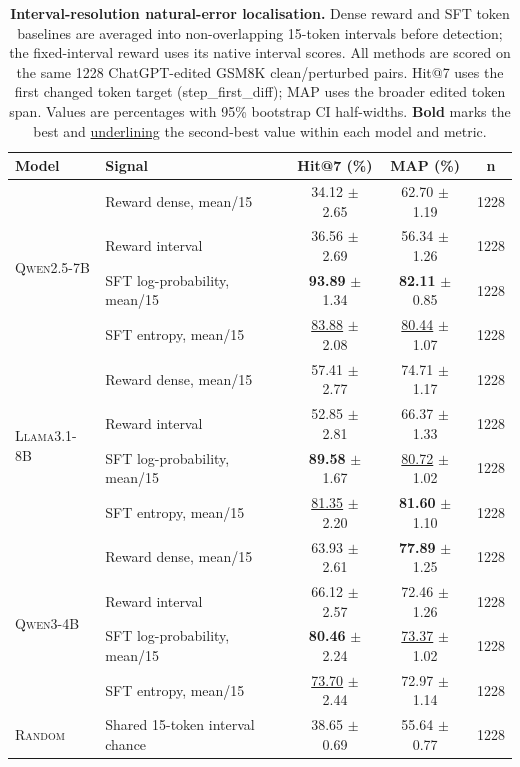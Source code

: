 \begin{table}[t]
\centering
\small
\setlength{\tabcolsep}{5pt}
\caption{\textbf{Interval-resolution natural-error localisation.} Dense reward and SFT token baselines are averaged into non-overlapping 15-token intervals before detection; the fixed-interval reward uses its native interval scores. All methods are scored on the same 1228 ChatGPT-edited GSM8K clean/perturbed pairs. Hit@7 uses the first changed token target (step\_first\_diff); MAP uses the broader edited token span. Values are percentages with 95\% bootstrap CI half-widths. \textbf{Bold} marks the best and \underline{underlining} the second-best value within each model and metric.}
\label{tab:localisation_chatgpt_step_sft_interval15_hit7_map}
\begin{tabular}{llccc}
\toprule
\textbf{Model} & \textbf{Signal} & \textbf{Hit@7 (\%)} & \textbf{MAP (\%)} & \textbf{n} \\
\midrule
\multirow{4}{*}{\textsc{Qwen2.5-7B}} & Reward dense, mean/15 & 34.12 $\pm$ 2.65 & 62.70 $\pm$ 1.19 & 1228 \\
 & Reward interval & 36.56 $\pm$ 2.69 & 56.34 $\pm$ 1.26 & 1228 \\
 & SFT log-probability, mean/15 & \textbf{93.89} $\pm$ 1.34 & \textbf{82.11} $\pm$ 0.85 & 1228 \\
 & SFT entropy, mean/15 & \underline{83.88} $\pm$ 2.08 & \underline{80.44} $\pm$ 1.07 & 1228 \\
\midrule
\multirow{4}{*}{\textsc{Llama3.1-8B}} & Reward dense, mean/15 & 57.41 $\pm$ 2.77 & 74.71 $\pm$ 1.17 & 1228 \\
 & Reward interval & 52.85 $\pm$ 2.81 & 66.37 $\pm$ 1.33 & 1228 \\
 & SFT log-probability, mean/15 & \textbf{89.58} $\pm$ 1.67 & \underline{80.72} $\pm$ 1.02 & 1228 \\
 & SFT entropy, mean/15 & \underline{81.35} $\pm$ 2.20 & \textbf{81.60} $\pm$ 1.10 & 1228 \\
\midrule
\multirow{4}{*}{\textsc{Qwen3-4B}} & Reward dense, mean/15 & 63.93 $\pm$ 2.61 & \textbf{77.89} $\pm$ 1.25 & 1228 \\
 & Reward interval & 66.12 $\pm$ 2.57 & 72.46 $\pm$ 1.26 & 1228 \\
 & SFT log-probability, mean/15 & \textbf{80.46} $\pm$ 2.24 & \underline{73.37} $\pm$ 1.02 & 1228 \\
 & SFT entropy, mean/15 & \underline{73.70} $\pm$ 2.44 & 72.97 $\pm$ 1.14 & 1228 \\
\midrule
\textsc{Random} & Shared 15-token interval chance & 38.65 $\pm$ 0.69 & 55.64 $\pm$ 0.77 & 1228 \\
\bottomrule
\end{tabular}
\end{table}
